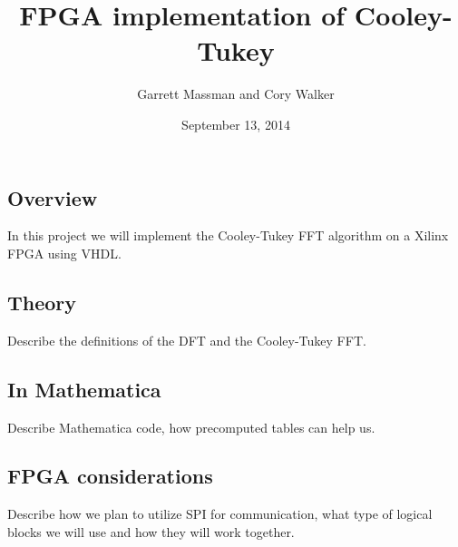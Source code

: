 \documentclass[12pt]{article}
\title{FPGA implementation of Cooley-Tukey}
\date{September 13, 2014}
\author{Garrett Massman and Cory Walker}
\begin{document}
  \maketitle

  \subsection*{Overview}
    In this project we will implement the Cooley-Tukey FFT algorithm on a Xilinx FPGA using VHDL.
  \subsection*{Theory}
    Describe the definitions of the DFT and the Cooley-Tukey FFT.
  \subsection*{In Mathematica}
    Describe Mathematica code, how precomputed tables can help us.
  \subsection*{FPGA considerations}
    Describe how we plan to utilize SPI for communication, what type of logical blocks we will use and how they will work together.
\end{document}
